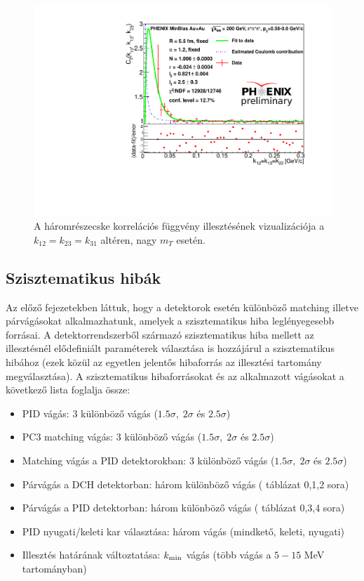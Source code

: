 \documentclass[11pt,a4paper]{article}
\numberwithin{equation}{subsection}
\numberwithin{figure}{section}
\begin{document}
\begin{figure}[H]
\centering
\includegraphics[scale=0.6]{pic/res/diag_highpt.pdf}
\caption{A háromrészecske korrelációs függvény illesztésének vizualizációja a $k_{12}=k_{23}=k_{31}$ altéren, nagy $m_T$ esetén.}
\label{fig:fit2}
\end{figure}



\subsection{Szisztematikus hibák}

Az előző fejezetekben láttuk, hogy a detektorok esetén különböző matching illetve párvágásokat alkalmazhatunk, amelyek a szisztematikus hiba leglényegesebb forrásai. A detektorrendszerből származó szisztematikus hiba mellett az illesztésnél elődefiniált paraméterek választása is hozzájárul a szisztematikus hibához (ezek közül az egyetlen jelentős hibaforrás az illesztési tartomány megválasztása). A szisztematikus hibaforrásokat és az alkalmazott vágásokat a következő lista foglalja össze:

\begin{itemize}
\item PID vágás: 3 különböző vágás ($1.5\sigma,\;2\sigma$ és $2.5\sigma$)
\item PC3 matching vágás: 3 különböző vágás ($1.5\sigma,\;2\sigma$ és $2.5\sigma$)
\item Matching vágás a PID detektorokban: 3 különböző vágás ($1.5\sigma,\;2\sigma$ és $2.5\sigma$)
\item Párvágás a DCH detektorban: három különböző vágás ( táblázat 0,1,2 sora)
\item Párvágás a PID detektorban: három különböző vágás ( táblázat 0,3,4 sora)
\item PID nyugati/keleti kar választása: három vágás (mindkető, keleti, nyugati)
\item Illesztés határának változtatása: $k_{\rm min}$ vágás (több vágás a $5-15$ MeV tartományban)
\end{itemize}
\end{document}
